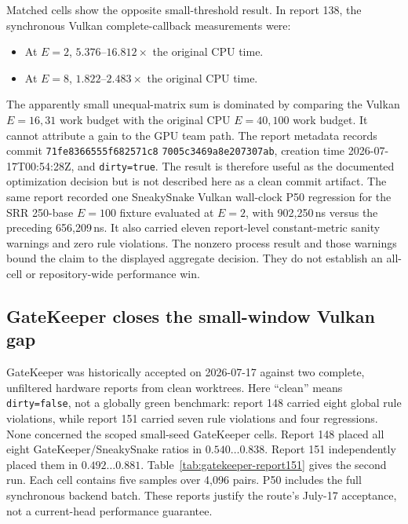 Matched cells show the opposite small-threshold result.  In report 138, the
synchronous Vulkan complete-callback measurements were:

\begin{itemize}
    \item At \(E=2\), \(5.376\)--\(16.812\times\) the original CPU time.
    \item At \(E=8\), \(1.822\)--\(2.483\times\) the original CPU time.
\end{itemize}

The apparently small unequal-matrix sum is dominated by comparing the Vulkan
\(E=16,31\) work budget with the original CPU \(E=40,100\) work budget.  It
cannot attribute a gain to the GPU team path.  The report metadata records commit
\texttt{71fe8366555f682571c8}\allowbreak
\texttt{7005c3469a8e207307ab}, creation time
2026-07-17T00:54:28Z, and \texttt{dirty=true}.  The result is therefore useful
as the documented optimization decision but is not described here as a clean
commit artifact.  The same report recorded one SneakySnake Vulkan wall-clock
P50 regression for the SRR 250-base \(E=100\) fixture evaluated at \(E=2\),
with 902,250\,ns versus the preceding 656,209\,ns.  It also carried eleven
report-level constant-metric sanity warnings and zero rule violations.  The
nonzero process result and those warnings bound the claim to the displayed
aggregate decision.  They do not establish an all-cell or repository-wide
performance win.

\subsection{GateKeeper closes the small-window Vulkan gap}

GateKeeper was historically accepted on 2026-07-17 against two complete,
unfiltered hardware reports from clean worktrees.  Here ``clean'' means
\texttt{dirty=false}, not a globally green benchmark: report 148 carried eight
global rule violations, while report 151 carried seven rule violations and
four regressions.  None concerned the scoped small-seed GateKeeper cells.
Report 148 placed all eight
GateKeeper/SneakySnake ratios in
\(0.540\ldots0.838\).  Report 151 independently placed them in
\(0.492\ldots0.881\).  Table~\ref{tab:gatekeeper-report151} gives the second
run.  Each cell contains five samples over 4,096 pairs.  P50 includes the full
synchronous backend batch.  These reports justify the route's July-17
acceptance, not a current-head performance guarantee.

